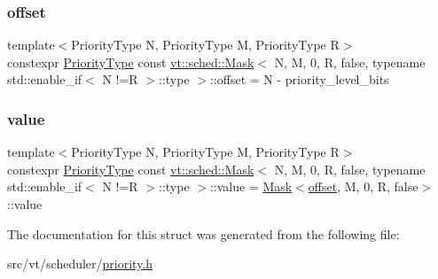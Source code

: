 \subsubsection{\texorpdfstring{offset}{offset}}
{\footnotesize\ttfamily template$<$Priority\+Type N, Priority\+Type M, Priority\+Type R$>$ \\
constexpr \hyperlink{namespacevt_a86bff9f556eb761b27fc8600d006ac04}{Priority\+Type} const \hyperlink{structvt_1_1sched_1_1_mask}{vt\+::sched\+::\+Mask}$<$ N, M, 0, R, false, typename std\+::enable\+\_\+if$<$ N !=R $>$\+::type $>$\+::offset = N -\/ priority\+\_\+level\+\_\+bits\hspace{0.3cm}{\ttfamily [static]}}

\mbox{\label{structvt_1_1sched_1_1_mask_3_01_n_00_01_m_00_010_00_01_r_00_01false_00_01typename_01std_1_1enabl81bb113ca3757a124cb0c647589aa3dd_a1f4fbcc1ba267a7c9e1585f33b0ccd52}} 
\subsubsection{\texorpdfstring{value}{value}}
{\footnotesize\ttfamily template$<$Priority\+Type N, Priority\+Type M, Priority\+Type R$>$ \\
constexpr \hyperlink{namespacevt_a86bff9f556eb761b27fc8600d006ac04}{Priority\+Type} const \hyperlink{structvt_1_1sched_1_1_mask}{vt\+::sched\+::\+Mask}$<$ N, M, 0, R, false, typename std\+::enable\+\_\+if$<$ N !=R $>$\+::type $>$\+::value = \hyperlink{structvt_1_1sched_1_1_mask}{Mask}$<$\hyperlink{structvt_1_1sched_1_1_mask_3_01_n_00_01_m_00_010_00_01_r_00_01false_00_01typename_01std_1_1enabl81bb113ca3757a124cb0c647589aa3dd_a19acd4efecf001695272262bd0baa93b}{offset}, M, 0, R, false$>$\+::value\hspace{0.3cm}{\ttfamily [static]}}



The documentation for this struct was generated from the following file\+:\begin{DoxyCompactItemize}
\item 
src/vt/scheduler/\hyperlink{priority_8h}{priority.\+h}\end{DoxyCompactItemize}
